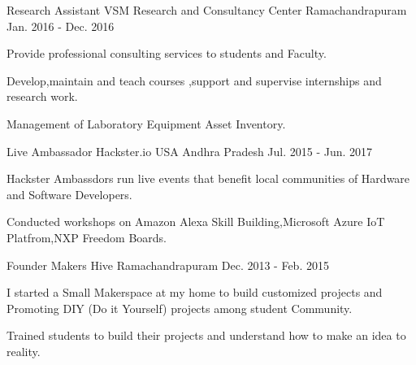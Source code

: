 \begin{cventries}
  \cventry
    {Research Assistant}
    {VSM Research and Consultancy Center}
    {Ramachandrapuram}
    {Jan. 2016 - Dec. 2016}
    {
      \begin{cvitems}
        \item {Provide professional consulting services to students and Faculty.}
	\item{Develop,maintain and teach courses ,support and supervise internships and research work.}
        \item {Management of Laboratory Equipment Asset Inventory.}
      \end{cvitems} 
    }
  \cventry
    {Live Ambassador}
    {Hackster.io USA}
    {Andhra Pradesh}
    {Jul. 2015 - Jun. 2017}
    {
      \begin{cvitems}
        \item {Hackster Ambassdors run live events that benefit local communities of Hardware and Software Developers.}
	\item{Conducted workshops on Amazon Alexa Skill Building,Microsoft Azure IoT Platfrom,NXP Freedom Boards.}
      \end{cvitems}
    }
  \cventry
    {Founder}
    {Makers Hive}
    {Ramachandrapuram}
    {Dec. 2013 - Feb. 2015}
    {
      \begin{cvitems}
        \item {I started a Small Makerspace at my home to build customized projects and Promoting DIY (Do it Yourself) projects among student Community. }
	\item{Trained students to build their projects and understand how to make an idea to reality.}
      \end{cvitems}
    }
\end{cventries}

